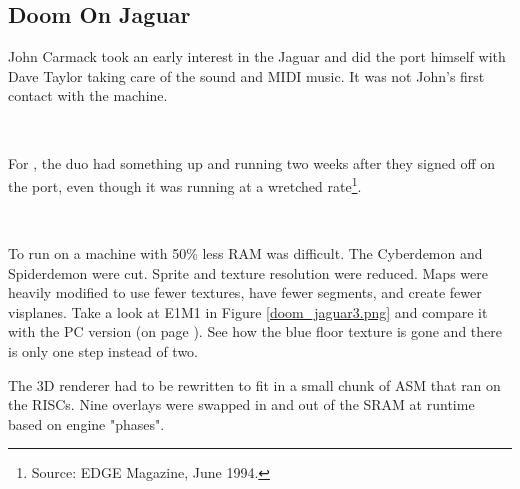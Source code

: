 \subsection{Doom On Jaguar}
John Carmack took an early interest in the Jaguar and did the port himself with Dave Taylor taking care of the sound and MIDI music. It was not John's first contact with the machine.\\
\par
{}\\
\par
For \doom, the duo had something up and running two weeks after they signed off on the port, even though it was running at a wretched rate\footnote{Source: EDGE Magazine, June 1994.}.\\
\par
{}\\
\par
To run on a machine with 50\% less RAM was difficult. The Cyberdemon and Spiderdemon were cut. Sprite and texture resolution were reduced. Maps were heavily modified to use fewer textures, have fewer segments, and create fewer visplanes. Take a look at E1M1 in Figure \ref{doom_jaguar3.png} and compare it with the PC version (on page \pageref{mashed_potatoes1.png}). See how the blue floor texture is gone and there is only one step instead of two.\\
\par
The 3D renderer had to be rewritten to fit in a small chunk of ASM that ran on the RISCs. Nine overlays were swapped in and out of the SRAM at runtime based on engine "phases".\\
\par
{}
\par

